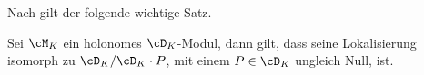 Nach \cite[Cor 4.2.8]{sabbah_cimpa90} gilt der folgende wichtige Satz.
\begin{thm} \label{thm:lokalHoloZuQuot}
Sei $\cM_K$ ein holonomes $\cD_K$-Modul, dann gilt, dass seine Lokalisierung
isomorph zu $\cD_K/\cD_K\cdot P$, mit einem $P\in \cD_K$ ungleich Null, ist.
\end{thm}

\begin{comment}
\subsubsection{Alternative Definition B} %
\begin{defn} \cite[Def 3.3.1.]{sabbah_cimpa90}
Sei $\cM$ lineares Differentialsystem
(linear differential system) %
.  Man sagt, $\cM$ ist holonom, falls $\cM=0$ oder falls $\Car\cM\subset
\{x=0\}\cup{\xi=0}$.
\end{defn}
\begin{lem} \cite[Lem 3.3.8.]{sabbah_cimpa90}
Ein $\cD$-Modul ist holonom genau dann, wenn $\dim_{gr^F\cD,0}gr^F\cM=1$.
\end{lem}
\begin{proof}
Siehe \cite[Lem 3.3.8.]{sabbah_cimpa90}
\end{proof}
\end{comment}

\begin{comment}
\subsubsection{Alternative Definition A} %
\begin{defn}[Holonome $\cD$-Moduln]
\cite[Chap 10 §1]{coutinho1995primer}
Ein endlich generierter $\cD$-Modul $\cM$ ist \emph{holonom}, falls $\cM=0$
gilt, oder falls es die Dimension $1$ hat.
\end{defn}
\begin{bem}
\cite[Chap 10 §1]{coutinho1995primer}
Sei $\mathfrak{a}\neq 0$ ein Links-Ideal von $\cD$. Es gilt nach
\cite[Corollary 9.3.5]{coutinho1995primer}, dass $d(\cD/\mathfrak{a})\leq 1$.
Falls $\mathfrak{a}\neq\cD$, dann gilt nach der \emph{Bernstein's inequality}
\cite[Chap 9 §4]{coutinho1995primer}, dass $d(\cD/\mathfrak{a})=1$. Somit ist
$\cD/\mathfrak{a}$ ein holonomes $\cD$-Modul.
\end{bem}
\end{comment}

